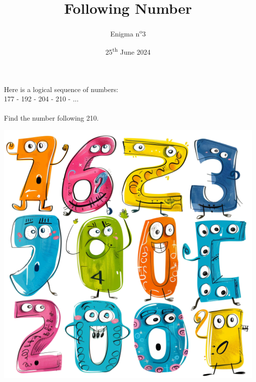 \documentclass[a4paper, top=10mm]{article}
\title{\textbf{\huge{Following Number}}}
\author{Enigma n\textsuperscript{o}3}
\date{25\textsuperscript{th} June 2024}
\begin{document}
	\maketitle
	
	\Large
	Here is a logical sequence of numbers:\\
	177 - 192 - 204 - 210 - ...\\
	\\
	Find the number following 210.
	
	\begin{center}
		\includegraphics[width=\linewidth]{03image.png}\\
	\end{center}
	
	
	
	
\end{document}
